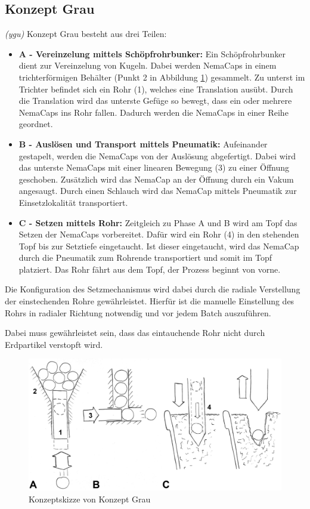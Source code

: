 \subsection{Konzept Grau}
\textit{(ygu)} Konzept Grau besteht aus drei Teilen:
\begin{itemize}
	\item \textbf{A - Vereinzelung mittels Schöpfrohrbunker:}
	Ein Schöpfrohrbunker dient zur Vereinzelung von Kugeln. Dabei werden NemaCaps in einem trichterförmigen Behälter (Punkt 2 in Abbildung \ref{fig:konzept_grau}) gesammelt. Zu unterst im Trichter befindet sich ein Rohr (1), welches eine Translation ausübt. Durch die Translation wird das unterste Gefüge so bewegt, dass ein oder mehrere NemaCaps ins Rohr fallen. Dadurch werden die NemaCaps in einer Reihe geordnet.
	
	\item \textbf{B - Auslösen und Transport mittels Pneumatik:}
	Aufeinander gestapelt, werden die NemaCaps von der Auslösung abgefertigt. Dabei wird das unterste NemaCaps mit einer linearen Bewegung (3) zu einer Öffnung geschoben. Zusätzlich wird das NemaCap an der Öffnung durch ein Vakum angesaugt. Durch einen Schlauch wird das NemaCap mittels Pneumatik zur Einsetzlokalität transportiert. 
	
	\item \textbf{C - Setzen mittels Rohr:}
	Zeitgleich zu Phase A und B wird am Topf das Setzen der NemaCaps vorbereitet. Dafür wird ein Rohr (4) in den stehenden Topf bis zur Setztiefe eingetaucht. Ist dieser eingetaucht, wird das NemaCap durch die Pneumatik zum Rohrende transportiert und somit im Topf platziert. Das Rohr fährt aus dem Topf, der Prozess beginnt von vorne.
\end{itemize}

Die Konfiguration des Setzmechanismus wird dabei durch die radiale Verstellung der einstechenden Rohre gewährleistet. Hierfür ist die manuelle Einstellung des Rohrs in radialer Richtung notwendig und vor jedem Batch auszuführen.

Dabei muss gewährleistet sein, dass das eintauchende Rohr nicht durch Erdpartikel verstopft wird.
\begin{figure}[H]
	\includegraphics[scale=0.52]{Illustrationen/5-Konzept/grau_Konzept.jpg}
	\caption{Konzeptskizze von Konzept Grau}
	\label{fig:konzept_grau}
\end{figure}
